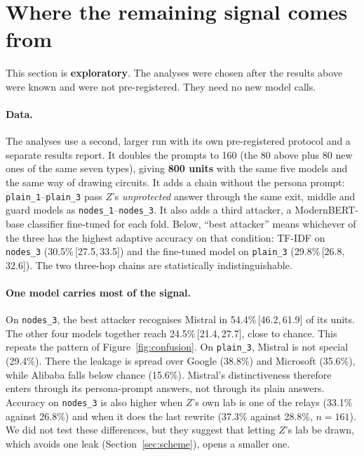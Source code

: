 \documentclass[11pt]{article}
\newcommand{\cond}[1]{\texttt{#1}}
\newcommand{\ci}[2]{\,[#1,\,#2]}
\begin{document}
\section{Where the remaining signal comes from}
\label{sec:residual}

This section is \textbf{exploratory}. The analyses were chosen after the results above were known and were not pre-registered. They need no new model calls.

\paragraph{Data.} The analyses use a second, larger run with its own pre-registered protocol and a separate results report. It doubles the prompts to 160 (the 80 above plus 80 new ones of the same seven types), giving \textbf{800 units} with the same five models and the same way of drawing circuits. It adds a chain without the persona prompt: \cond{plain\_1}--\cond{plain\_3} pass $Z$'s \emph{unprotected} answer through the same exit, middle and guard models as \cond{nodes\_1}--\cond{nodes\_3}. It also adds a third attacker, a ModernBERT-base classifier fine-tuned for each fold. Below, ``best attacker'' means whichever of the three has the highest adaptive accuracy on that condition: TF-IDF on \cond{nodes\_3} (30.5\%\ci{27.5}{33.5}) and the fine-tuned model on \cond{plain\_3} (29.8\%\ci{26.8}{32.6}). The two three-hop chains are statistically indistinguishable.

\paragraph{One model carries most of the signal.} On \cond{nodes\_3}, the best attacker recognises Mistral in 54.4\%\ci{46.2}{61.9} of its units. The other four models together reach 24.5\%\ci{21.4}{27.7}, close to chance. This repeats the pattern of Figure~\ref{fig:confusion}. On \cond{plain\_3}, Mistral is not special (29.4\%). There the leakage is spread over Google (38.8\%) and Microsoft (35.6\%), while Alibaba falls below chance (15.6\%). Mistral's distinctiveness therefore enters through its persona-prompt answers, not through its plain answers. Accuracy on \cond{nodes\_3} is also higher when $Z$'s own lab is one of the relays (33.1\% against 26.8\%) and when it does the last rewrite (37.3\% against 28.8\%, $n=161$). We did not test these differences, but they suggest that letting $Z$'s lab be drawn, which avoids one leak (Section~\ref{sec:scheme}), opens a smaller one.
\end{document}
